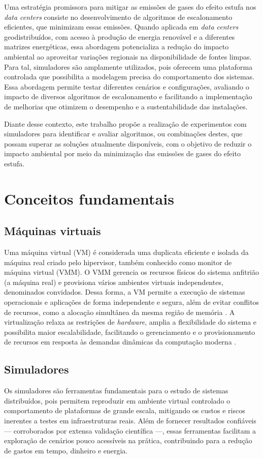 \documentclass[12pt]{article}
\begin{document}
Uma estratégia promissora para mitigar as emissões de gases do efeito estufa nos \textit{data centers} consiste no desenvolvimento de algoritmos de escalonamento eficientes, que minimizam essas emissões. Quando aplicada em \textit{data centers} geodistribuídos, com acesso à produção de energia renovável e a diferentes matrizes energéticas, essa abordagem potencializa a redução do impacto ambiental ao aproveitar variações regionais na disponibilidade de fontes limpas. Para tal, simuladores são amplamente utilizados, pois oferecem uma plataforma controlada que possibilita a modelagem precisa do comportamento dos sistemas. Essa abordagem permite testar diferentes cenários e configurações, avaliando o impacto de diversos algoritmos de escalonamento e facilitando a implementação de melhorias que otimizem o desempenho e a sustentabilidade das instalações.

Diante desse contexto, este trabalho propõe a realização de experimentos com simuladores para identificar e avaliar algoritmos, ou combinações destes, que possam superar as soluções atualmente disponíveis, com o objetivo de reduzir o impacto ambiental por meio da minimização das emissões de gases do efeito estufa.

\section{Conceitos fundamentais}
\subsection{Máquinas virtuais}
Uma máquina virtual (VM) é considerada uma duplicata eficiente e isolada da máquina real criado pelo hipervisor, também conhecido como monitor de máquina virtual (VMM). O VMM gerencia os recursos físicos do sistema anfitrião (a máquina real) e provisiona vários ambientes virtuais independentes, denominados convidados. Dessa forma, a VM permite a execução de sistemas operacionais e aplicações de forma independente e segura, além de evitar conflitos de recursos, como a alocação simultânea da mesma região de memória \cite{popek:74}. A virtualização relaxa as restrições de \textit{hardware}, amplia a flexibilidade do sistema e possibilita maior escalabilidade, facilitando o gerenciamento e o provisionamento de recursos em resposta às demandas dinâmicas da computação moderna \cite{buyya:13}.

\subsection{Simuladores}
Os simuladores são ferramentas fundamentais para o estudo de sistemas distribuídos, pois permitem reproduzir em ambiente virtual controlado o comportamento de plataformas de grande escala, mitigando os custos e riscos inerentes a testes em infraestruturas reais. Além de fornecer resultados confiáveis --- corroborados por extensa validação científica ---, essas ferramentas facilitam a exploração de cenários pouco acessíveis na prática, contribuindo para a redução de gastos em tempo, dinheiro e energia.
\end{document}
